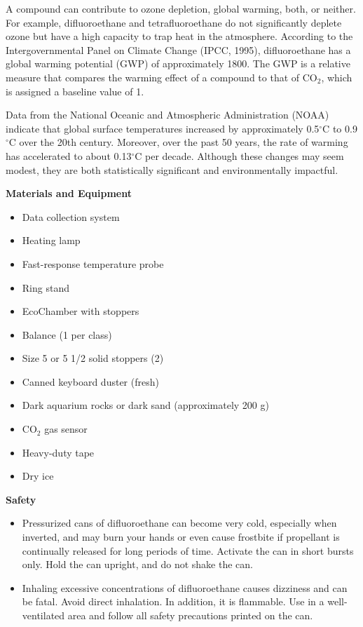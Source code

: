 \documentclass[english,twoside]{article}
\begin{document}
A compound can contribute to ozone depletion, global warming, both, or neither. For example, difluoroethane and tetrafluoroethane do not significantly deplete ozone but have a high capacity to trap heat in the atmosphere. According to the Intergovernmental Panel on Climate Change (IPCC, 1995), difluoroethane has a global warming potential (GWP) of approximately 1800. The GWP is a relative measure that compares the warming effect of a compound to that of CO$_2$, which is assigned a baseline value of 1.

Data from the National Oceanic and Atmospheric Administration (NOAA) indicate that global surface temperatures increased by approximately 0.5$^\circ$C to 0.9$^\circ$C over the 20th century. Moreover, over the past 50 years, the rate of warming has accelerated to about 0.13$^\circ$C per decade. Although these changes may seem modest, they are both statistically significant and environmentally impactful.

\textbf{Materials and Equipment}
\begin{itemize}
	\item Data collection system	
	\item Heating lamp 
	\item Fast-response temperature probe 	
	\item Ring stand
	\item EcoChamber with stoppers	
	\item Balance (1 per class)
	\item Size 5 or 5 1/2 solid stoppers (2)	
	\item Canned keyboard duster (fresh)
	\item Dark aquarium rocks or dark sand (approximately 200 g)
	\item CO$_2$ gas sensor		
	\item Heavy-duty tape
	\item Dry ice
\end{itemize}

\textbf{Safety}
\begin{itemize}
	\item Pressurized cans of difluoroethane can become very cold, especially when inverted, and may burn your hands or even cause frostbite if propellant is continually released for long periods of time. Activate the can in short bursts only. Hold the can upright, and do not shake the can.
	\item Inhaling excessive concentrations of difluoroethane causes dizziness and can be fatal. Avoid direct inhalation. In addition, it is flammable. Use in a well-ventilated area and follow all safety precautions printed on the can.
\end{itemize}
\end{document}
